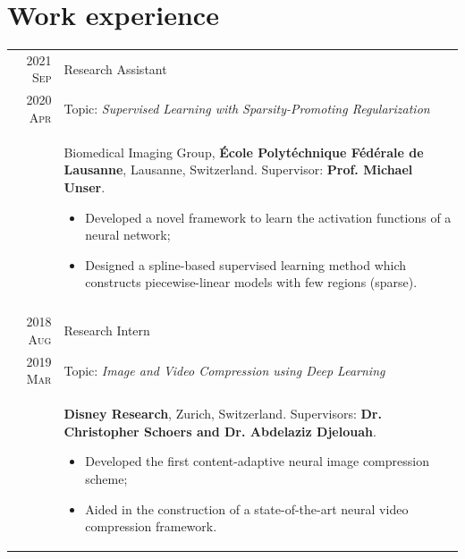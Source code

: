 \documentclass[a4paper,10pt]{article}
\begin{document}
  \vspace{15pt}

  \section{Work experience}

    \begin{tabular}{r|p{13cm}}

      \textsc{2021 Sep} 	& Research Assistant \\
      \textsc{2020 Apr} 	& Topic: \emph{Supervised Learning with Sparsity-Promoting Regularization} \\
				& \footnotesize{ Biomedical Imaging Group, \textbf{École Polytéchnique Fédérale de Lausanne}, Lausanne, Switzerland. Supervisor: \textbf{Prof. Michael Unser}.
				  }
        \begin{itemize}[leftmargin=*,noitemsep]
          \item \footnotesize{Developed a novel framework to learn the activation functions of a neural network;}
          \item \footnotesize{Designed a spline-based supervised learning method which constructs piecewise-linear models with few regions (sparse).}
        \end{itemize} \vspace*{-\baselineskip}\\
      \multicolumn{2}{c}{} \\

      \textsc{2018 Aug} & Research Intern \\
      \textsc{2019 Mar} & Topic: \emph{Image and Video Compression using Deep Learning} \\
				& \footnotesize{\textbf{Disney Research}, Zurich, Switzerland. Supervisors: \textbf{Dr. Christopher Schoers and Dr. Abdelaziz Djelouah}.}
        \begin{itemize}[leftmargin=*,noitemsep]
          \item \footnotesize{
            Developed the first content-adaptive neural image compression scheme;}
          \item  \footnotesize{
            Aided in the construction of a state-of-the-art neural video compression framework.}
          \end{itemize} \vspace*{-\baselineskip}

    \end{tabular}
\end{document}
